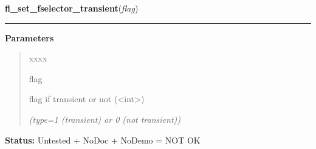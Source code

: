 \hspace{.8\funcindent}\begin{boxedminipage}{\funcwidth}

    \raggedright \textbf{fl\_set\_fselector\_transient}(\textit{flag})

    \vspace{-1.5ex}

    \rule{\textwidth}{0.5\fboxrule}
\setlength{\parskip}{2ex}
\setlength{\parskip}{1ex}
      \textbf{Parameters}
      \vspace{-1ex}

      \begin{quote}
        \begin{Ventry}{xxxx}

          \item[flag]

          flag if transient or not ({\textless}int{\textgreater})

            {\it (type=1 (transient) or 0 (not transient))}

        \end{Ventry}

      \end{quote}

\textbf{Status:} Untested + NoDoc + NoDemo = NOT OK



    \end{boxedminipage}

    \label{xformslib:library:fl_set_fselector_callback}

    \vspace{0.5ex}

